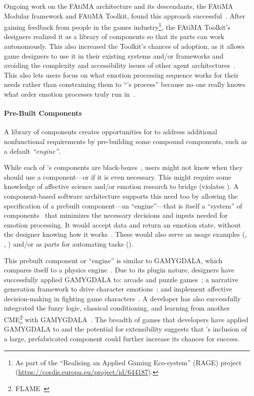 Ongoing work on the FAtiMA architecture and its descendants, the FAtiMA Modular
framework and FAtiMA Toolkit, found this approach
successful~\citep[p.~8:2, 8:12--8:13]{mascarenhas2022fatima}. After gaining
feedback from people in the games industry\footnote{As part of the ``Realising
an Applied Gaming Eco-system'' (RAGE) project
(\href{https://cordis.europa.eu/project/id/644187}{https://cordis.europa.eu/project/id/644187}).},
 the FAtiMA Toolkit's designers realized it as a library of components so that
its parts can work autonomously. This also increased the Toolkit's chances of
adoption, as it allows game designers to use it in their existing systems
and/or frameworks and avoiding the complexity and accessibility issues of other
agent architectures~\citep[p.~3]{guimaraes2022fatima}. This also lets users
focus on what emotion processing sequence works for their needs rather than
constraining them to ``\progname{}'s process'' because no one really knows what
order emotion processes truly run in~\citep[p.~142]{moffat1997personality}.

\paragraph{Pre-Built Components}
A library of components creates opportunities for \progname{} to address
additional nonfunctional requirements by pre-building some compound components,
such as a default \textit{``engine''}.

While each of \progname{}'s components are
black-boxes~\citep[p.~253]{qian2010software}, users might not know when they
should use a component---or if it is even necessary. This might require some
knowledge of affective science and/or emotion research to bridge (violates
). A component-based software architecture supports this need
too by allowing the specification of a prebuilt component---an
``engine''---that is itself a ``system'' of
components~\citep[p.~249]{qian2010software} that minimizes the necessary
decisions and inputs needed for emotion processing. It would accept data and
return an emotion state, without the designer knowing how it
works~\citep[p.~443]{rodriguez2015computational}. These would also serve as
usage examples (, , )
and/or as parts for automating tasks ().

This prebuilt component or ``engine'' is similar to GAMYGDALA, which compares
itself to a physics engine~\citep[p.~32]{popescu2014gamygdala}. Due to its
plugin nature, designers have successfully applied GAMYGDALA to: arcade and
puzzle games~\citep{broekens2015emotion}; a narrative generation framework to
drive character emotions~\citep{kaptein2015affective}; and implement affective
decision-making in fighting game characters~\citep{yuda2019creating}. A
developer has also successfully integrated the fuzzy logic, classical
conditioning, and learning from another CME\footnote{FLAME~\citep{el2000flame}}
with GAMYGDALA~\citep[p.~4]{code2015learning}. The breadth of games that
developers have applied GAMYGDALA to and the potential for extensibility
suggests that \progname{}'s inclusion of a large, prefabricated component could
further increase its chances for success.


